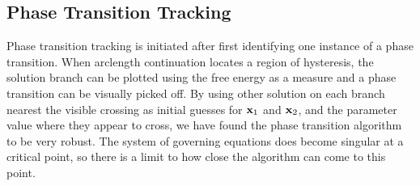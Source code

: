 \subsection{Phase Transition Tracking} \label{sec:PTT}
Phase transition tracking is initiated after first identifying one instance of a phase transition. When arclength continuation locates a region of hysteresis, the solution branch can be plotted using the free energy as a measure and a phase transition can be visually picked off. By using other solution on each branch nearest the visible crossing as initial guesses for ${\bf x}_1$ and ${\bf x}_2$, and the parameter value where they appear to cross, we have found the phase transition algorithm to be very robust. The system of governing equations does become singular at a critical point, so there is a limit to how close the algorithm can come to this point.
